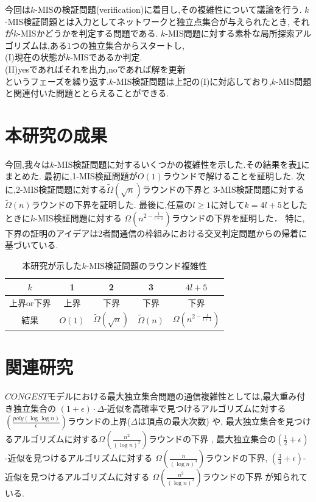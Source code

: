 \documentclass[12pt]{thesis}
\theoremstyle{definition}
\begin{document}
今回は$k$-MISの検証問題(verification)に着目し,その複雑性について議論を行う.
$k$-MIS検証問題とは入力としてネットワークと独立点集合が与えられたとき,
それが$k$-MISかどうかを判定する問題である.
$k$-MIS問題に対する素朴な局所探索アルゴリズムは,ある1つの独立集合からスタートし, \\
(I)現在の状態が$k$-MISであるか判定. \\
(II)yesであればそれを出力,noであれば解を更新 \\
というフェーズを繰り返す.$k$-MIS検証問題は上記の(I)に対応しており,$k$-MIS問題と関連付いた問題ととらえることができる.

\section{本研究の成果}
今回,我々は$k$-MIS検証問題に対するいくつかの複雑性を示した.その結果を表\ref{tab: k-MIS}にまとめた.
最初に,1-MIS検証問題が$O(1)$ラウンドで解けることを証明した.
次に,2-MIS検証問題に対する$\tilde{\Omega} (\sqrt{n})$ラウンドの下界と
3-MIS検証問題に対する$\tilde{\Omega} (n)$ラウンドの下界を証明した.
最後に,任意の$l \geq 1$に対して$k = 4l + 5$としたときに$k$-MIS検証問題に対する
$\Omega\left(n^{2 - \frac{1}{l+1}}\right)$ラウンドの下界を証明した．
特に,下界の証明のアイデアは2者間通信の枠組みにおける交叉判定問題からの帰着に基づいている.

\begin{table}[htb]
  \begin{center}
    \caption{本研究が示した$k$-MIS検証問題のラウンド複雑性}
    \begin{tabular}{|c||c|c|c|c|} \hline
      $k$ & 1 & 2 & 3 & $4l + 5$ \\ \hline
      上界or下界 & 上界 & 下界 & 下界 & 下界 \\ \hline
      結果 & $O(1)$ & $\tilde{\Omega} (\sqrt{n})$ & $\tilde{\Omega} (n)$ & $\Omega\left(n^{2 - \frac{1}{l+1}}\right)$ \\ \hline
    \end{tabular}
    \label{tab: k-MIS}
  \end{center}
\end{table}

\section{関連研究} 
$CONGEST$モデルにおける最大独立集合問題の通信複雑性としては,最大重み付き独立集合の
$(1 + \epsilon) \cdot \Delta$-近似を高確率で見つけるアルゴリズムに対する
$\left(\frac{poly(\log \log n)}{\epsilon}\right)$ラウンドの上界($\Delta$は頂点の最大次数) \cite{kawarabayashi2019improved} や,
最大独立集合を見つけるアルゴリズムに対する$\Omega \left(\frac{n^{2}}{(\log n)^{2}}\right)$ラウンドの下界 \cite{censor2017quadratic},
最大独立集合の$(\frac{1}{2} + \epsilon)$-近似を見つけるアルゴリズムに対する
$\Omega \left(\frac{n}{(\log n)^{3}}\right)$ラウンドの下界,
$(\frac{3}{4} + \epsilon)$-近似を見つけるアルゴリズムに対する
$\Omega \left(\frac{n^{2}}{(\log n)^{3}}\right)$ラウンドの下界 \cite{efron2020beyond} が知られている.
 
\end{document}
